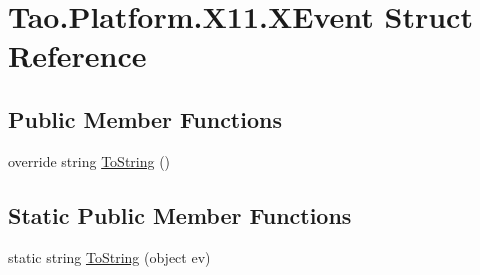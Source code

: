 \hypertarget{struct_tao_1_1_platform_1_1_x11_1_1_x_event}{
\section{Tao.Platform.X11.XEvent Struct Reference}
\label{struct_tao_1_1_platform_1_1_x11_1_1_x_event}
}
\subsection*{Public Member Functions}
\begin{DoxyCompactItemize}
\item 
override string \hyperlink{struct_tao_1_1_platform_1_1_x11_1_1_x_event_a24b85155b927fe9322945e0355644859}{ToString} ()
\end{DoxyCompactItemize}
\subsection*{Static Public Member Functions}
\begin{DoxyCompactItemize}
\item 
static string \hyperlink{struct_tao_1_1_platform_1_1_x11_1_1_x_event_a28930a57607b7b28b8de24a72720d0c1}{ToString} (object ev)
\end{DoxyCompactItemize}
